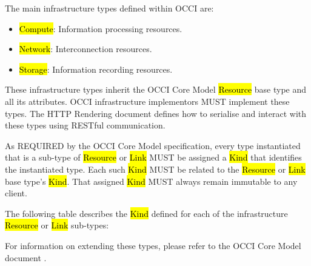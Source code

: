 \documentclass[10pt,a4paper]{article}
\begin{document}
The main infrastructure types defined within OCCI are:
\begin{itemize}
\item \hl{Compute}: Information processing resources.
\item \hl{Network}: Interconnection resources.
\item \hl{Storage}: Information recording resources.
\end{itemize}
These infrastructure types inherit the OCCI Core Model \hl{Resource} base type and all its 
attributes. OCCI infrastructure implementors MUST implement these types. The HTTP 
Rendering document defines how to serialise and interact with these types 
using RESTful communication.

As REQUIRED by the OCCI Core Model specification, every type instantiated that is 
a sub-type of \hl{Resource} or \hl{Link} MUST be assigned a \hl{Kind} that identifies the instantiated 
type. Each such \hl{Kind} MUST be related to the \hl{Resource} or \hl{Link} base type's \hl{Kind}. 
That assigned \hl{Kind} MUST always remain immutable to any client.

The following table describes the \hl{Kind} defined for each of the infrastructure \hl{Resource} 
or \hl{Link} sub-types:


For information on extending these types, please refer to the OCCI Core Model 
document \cite{occi:core}.
\end{document}

